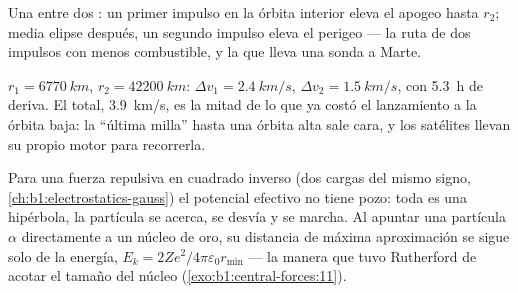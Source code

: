 \begin{omfigure}

{\small Una  entre dos : un
primer impulso en la órbita interior eleva el apogeo hasta $r_2$; media
elipse después, un segundo impulso eleva el perigeo --- la ruta de dos
impulsos con menos combustible, y la que lleva una sonda a Marte.}
\end{omfigure}

\begin{example}\label{ex:b1:central-forces:leogeo}
$r_1 = \qty{6770}{km}$, $r_2 = \qty{42200}{km}$: $\Delta v_1 = \qty{2.4}{km/s}$,
$\Delta v_2 = \qty{1.5}{km/s}$, con \qty{5.3}{h} de deriva. El total,
\qty{3.9}{km/s}, es la mitad de lo que ya costó el lanzamiento a la órbita
baja: la ``última milla'' hasta una órbita alta sale cara, y los satélites
llevan su propio motor para recorrerla.
\end{example}

\begin{remark}\label{rem:b1:central-forces:rutherford}
Para una fuerza repulsiva en cuadrado inverso (dos cargas del mismo signo,
\cref{ch:b1:electrostatics-gauss}) el potencial efectivo no tiene pozo:
toda  es una hipérbola, la partícula se acerca, se desvía y se
marcha. Al apuntar una partícula $\alpha$ directamente a un núcleo de oro,
su distancia de máxima aproximación se sigue solo de la energía, $E_k =
2Ze^2/4\pi\varepsilon_0 r_{\min}$ --- la manera que tuvo Rutherford de acotar
el tamaño del núcleo (\cref{exo:b1:central-forces:11}).
\end{remark}

